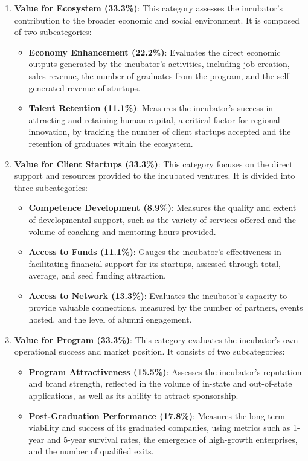 \documentclass[../Main.tex]{subfiles}
\begin{document}
\begin{enumerate}
    \item \textbf{Value for Ecosystem (33.3\%)}: This category assesses the incubator's contribution to the broader economic and social environment. It is composed of two subcategories:
    \begin{itemize}
        \item \textbf{Economy Enhancement (22.2\%)}: Evaluates the direct economic outputs generated by the incubator's activities, including job creation, sales revenue, the number of graduates from the program, and the self-generated revenue of startups.
        \item \textbf{Talent Retention (11.1\%)}: Measures the incubator's success in attracting and retaining human capital, a critical factor for regional innovation, by tracking the number of client startups accepted and the retention of graduates within the ecosystem.
    \end{itemize}
    
    \item \textbf{Value for Client Startups (33.3\%)}: This category focuses on the direct support and resources provided to the incubated ventures. It is divided into three subcategories:
    \begin{itemize}
        \item \textbf{Competence Development (8.9\%)}: Measures the quality and extent of developmental support, such as the variety of services offered and the volume of coaching and mentoring hours provided.
        \item \textbf{Access to Funds (11.1\%)}: Gauges the incubator's effectiveness in facilitating financial support for its startups, assessed through total, average, and seed funding attraction.
        \item \textbf{Access to Network (13.3\%)}: Evaluates the incubator's capacity to provide valuable connections, measured by the number of partners, events hosted, and the level of alumni engagement.
    \end{itemize}
    
    \item \textbf{Value for Program (33.3\%)}: This category evaluates the incubator's own operational success and market position. It consists of two subcategories:
    \begin{itemize}
        \item \textbf{Program Attractiveness (15.5\%)}: Assesses the incubator's reputation and brand strength, reflected in the volume of in-state and out-of-state applications, as well as its ability to attract sponsorship.
        \item \textbf{Post-Graduation Performance (17.8\%)}: Measures the long-term viability and success of its graduated companies, using metrics such as 1-year and 5-year survival rates, the emergence of high-growth enterprises, and the number of qualified exits.
    \end{itemize}
\end{enumerate}
\end{document}
